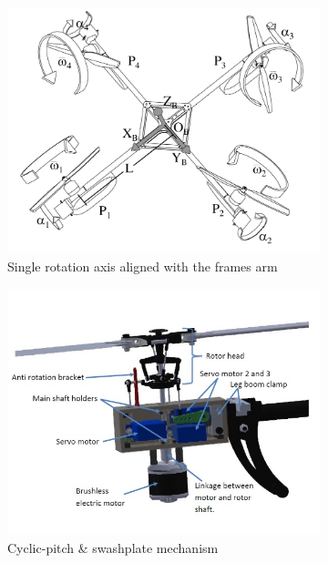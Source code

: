 \begin{figure}[htbp]
\centering
\begin{subfigure}{.5\textwidth}
\includegraphics[width=\textwidth]{figs/tiltpropellercontrol1}
\caption{Single rotation axis aligned with the frames arm}
\label{fig:tiltpropellercontrol1}
\end{subfigure}%
\begin{subfigure}{.5\textwidth}
\includegraphics[width=\textwidth]{figs/napsholm-mech}
\caption{Cyclic-pitch \& swashplate mechanism}
\label{fig:tiltrotor-napsholm}
\end{subfigure}
\caption{}
\label{fig:tiltprop}
\end{figure}
